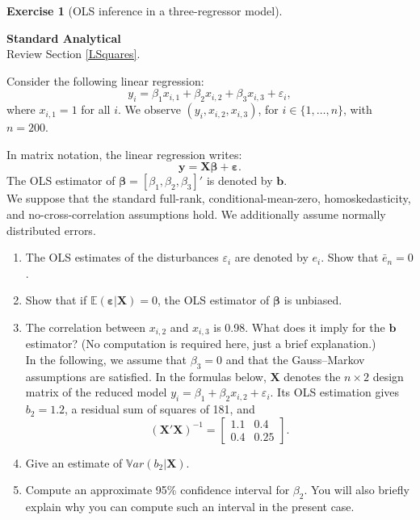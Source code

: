 \documentclass[
  11pt,
]{book}
\theoremstyle{definition}
\theoremstyle{definition}
\theoremstyle{definition}
\newtheorem{exercise}{Exercise}[chapter]
\theoremstyle{definition}
\theoremstyle{remark}
\begin{document}

\begin{exercisebox}

\begin{exercise}[OLS inference in a three-regressor model]
\protect\hypertarget{exr:regressions-ols-inference}{}\label{exr:regressions-ols-inference}

\textbf{Standard \textbar{} Analytical}\\
Review Section \ref{LSquares}.

Consider the following linear regression: \[y_i = \beta_1 x_{i,1} + \beta_2 x_{i,2} + \beta_3 x_{i,3} + \varepsilon_i,\] where \(x_{i,1} = 1\) for all \(i\). We observe \((y_i, x_{i,2}, x_{i,3})\), for \(i \in \{1, \dots, n\}\), with \(n = 200\).

In matrix notation, the linear regression writes: \[\mathbf{y} = \boldsymbol{X}\boldsymbol{\beta} + \boldsymbol{\varepsilon}.\] The OLS estimator of \(\boldsymbol{\beta} = [\beta_1, \beta_2, \beta_3]'\) is denoted by \(\mathbf{b}\).\\
We suppose that the standard full-rank, conditional-mean-zero, homoskedasticity, and no-cross-correlation assumptions hold. We additionally assume normally distributed errors.

\begin{enumerate}
\def\labelenumi{\arabic{enumi}.}
\item
  The OLS estimates of the disturbances \(\varepsilon_i\) are denoted by \(e_i\). Show that \(\bar{e}_n = 0\).
\item
  Show that if \(\mathbb{E}(\boldsymbol{\varepsilon} | \boldsymbol{X}) = 0\), the OLS estimator of \(\boldsymbol{\beta}\) is unbiased.
\item
  The correlation between \(x_{i,2}\) and \(x_{i,3}\) is 0.98. What does it imply for the \(\mathbf{b}\) estimator? (No computation is required here, just a brief explanation.)\\
  In the following, we assume that \(\beta_3 = 0\) and that the Gauss--Markov assumptions are satisfied. In the formulas below, \(\boldsymbol{X}\) denotes the \(n\times2\) design matrix of the reduced model \(y_i = \beta_1 + \beta_2 x_{i,2} + \varepsilon_i\). Its OLS estimation gives \(b_2 = 1.2\), a residual sum of squares of 181, and \[(\boldsymbol{X}'\boldsymbol{X})^{-1} =
  \begin{bmatrix}
  1.1 & 0.4 \\
  0.4 & 0.25
  \end{bmatrix}.\]
\item
  Give an estimate of \(\mathbb{V}ar(b_2|\boldsymbol{X})\).
\item
  Compute an approximate 95\% confidence interval for \(\beta_2\). You will also briefly explain why you can compute such an interval in the present case.
\end{enumerate}

\end{exercise}

\end{exercisebox}
\end{document}
